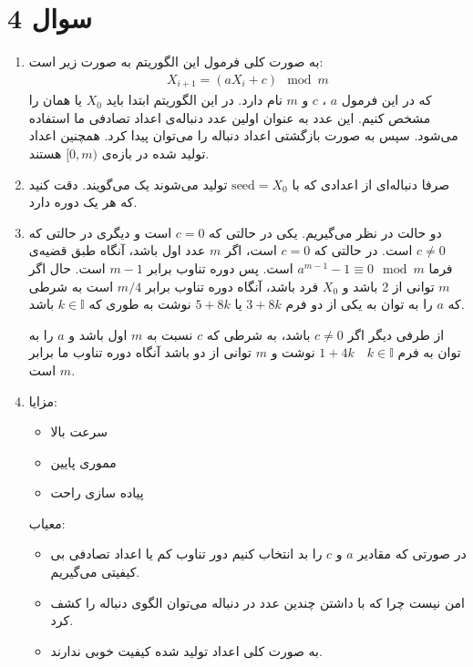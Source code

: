 \section*{سوال 4}
\begin{enumerate}
    \item به صورت کلی فرمول این الگوریتم به صورت زیر است:
    \begin{gather*}
        X_{i + 1} = (aX_i + c) \mod m
    \end{gather*}
    که در این فرمول
    $a$ ،
    $c$ 
    و
    $m$ 
    نام دارد. در این الگوریتم ابتدا باید
    $X_0$
    یا همان
    را مشخص کنیم. این عدد به عنوان اولین عدد دنباله‌ی اعداد تصادفی ما استفاده می‌شود. سپس به صورت بازگشتی
    اعداد دنباله را می‌توان پیدا کرد. همچنین اعداد تولید شده در بازه‌ی
    $[0, m)$
    هستند.
    \item صرفا دنباله‌ای از اعدادی که با $\text{seed} = X_0$ تولید می‌شوند یک
    می‌گویند. دقت کنید که هر
    یک دوره دارد.
    \item دو حالت در نظر می‌گیریم. یکی در حالتی که
    $c = 0$
    است و دیگری در حالتی که
    $c \neq 0$
    است. در حالتی که $c = 0$ است، اگر
    $m$
    عدد اول باشد، آنگاه طبق قضیه‌ی فرما
    $a^{m-1} - 1 \equiv 0 \mod m$ است.
    پس دوره تناوب برابر
    $m - 1$
    است. حال اگر
    $m$
    توانی از 2 باشد و
    $X_0$
    فرد باشد، آنگاه دوره تناوب برابر
    $m/4$
    است به شرطی که
    $a$
    را به توان به یکی از دو فرم
    $3 + 8k$ یا $5 + 8k$
    نوشت به طوری که
    $k \in \mathbb{I}$
    باشد.

    از طرفی دیگر اگر
    $c \neq 0$
    باشد، به شرطی که
    $c$
    نسبت به
    $m$
    اول باشد و
    $a$
    را به توان به فرم
    $1 + 4k \quad k \in \mathbb{I}$
    نوشت و
    $m$
    توانی از دو باشد آنگاه دوره تناوب ما برابر
    $m$
    است.
    \item مزایا: \begin{itemize}
        \item سرعت بالا
        \item مموری پایین
        \item پیاده سازی راحت
    \end{itemize}
    معیاب: \begin{itemize}
        \item در صورتی که مقادیر $a$ و $c$ را بد انتخاب کنیم دور تناوب کم یا اعداد تصادفی بی کیفیتی می‌گیریم.
        \item امن نیست چرا که با داشتن چندین عدد در دنباله می‌توان الگوی دنباله را کشف کرد.
        \item به صورت کلی اعداد تولید شده کیفیت خوبی ندارند.
    \end{itemize}
\end{enumerate}
